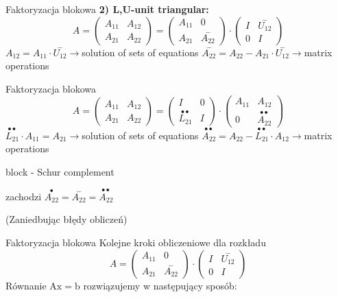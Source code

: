 \begin{frame}{Faktoryzacja blokowa}
\textbf{2) L,U-unit triangular:}
$$
A=\left(\begin{array}{ll}
A_{11} & A_{12}\\
A_{21} & A_{22}
\end{array}\right)=\left(\begin{array}{ll}
A_{11} & 0\\
A_{21} & \overset{-}{A_{22}}
\end{array}\right)\cdot \left(\begin{array}{ll}
I & \overset{-}{U_{12}}\\
0 & I
\end{array}\right)
$$
$ A_{12}=A_{11}\cdot \overset{-}{U_{12}}\rightarrow$solution of sets of equations $ \overset{-}{A_{22}}=A_{22}-A_{21}\cdot \overset{-}{U_{12}}\rightarrow$matrix operations

\end{frame}
\begin{frame}{Faktoryzacja blokowa}
$$
A=\left(\begin{array}{ll}
A_{11} & A_{12}\\
A_{21} & A_{22}
\end{array}\right)=\left(\begin{array}{ll}
I & 0\\
\overset{\bullet \bullet}{L_{21}} & I
\end{array}\right)\cdot \left(\begin{array}{ll}
A_{11} & A_{12}\\
 0 & \overset{\bullet \bullet}{A_{22}}
\end{array}\right)
$$
$ \overset{\bullet \bullet}{L_{21}}\cdot A_{11}=A_{21}\rightarrow$solution of sets of equations $ \overset{\bullet \bullet}{A_{22}}=A_{22}-\overset{\bullet \bullet}{L_{21}}\cdot A_{12}\rightarrow$matrix operations

block - Schur complement

zachodzi $\overset{\bullet}{A_{22}}=\overset{-}{A_{22}}=\overset{\bullet \bullet}{A_{22}}$

(Zaniedbując błędy obliczeń)
\end{frame}
\begin{frame}{Faktoryzacja blokowa}
Kolejne kroki obliczeniowe dla rozkładu
$$
A=\left(\begin{array}{ll}
A_{11} & 0\\
A_{21} & \overset{-}{A_{22}}
\end{array}\right)\cdot \left(\begin{array}{ll}
I & \overset{-}{U_{12}}\\
0 & I
\end{array}\right)
$$
Równanie $\mathrm{A}\mathrm{x}=\mathrm{b}$ rozwiązujemy w następujący sposób: 



\end{frame}
